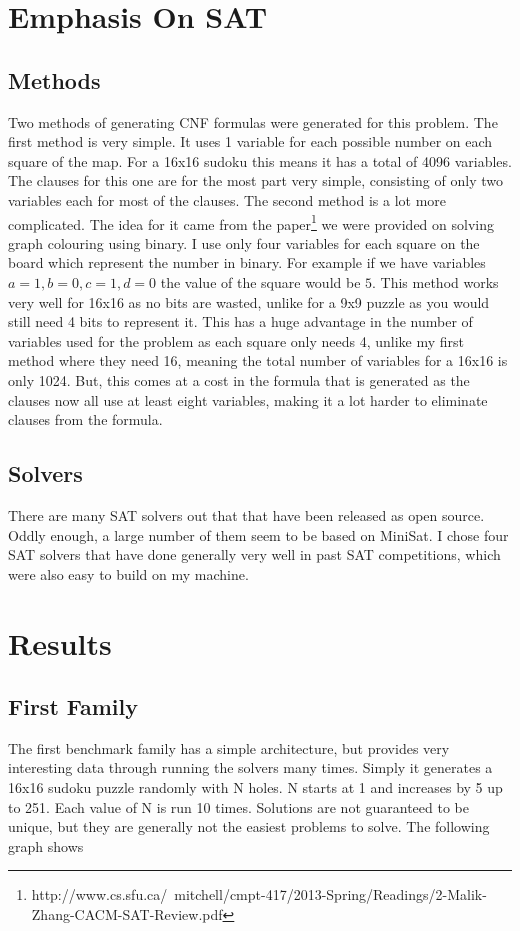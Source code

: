 \documentclass[11pt]{article} %
\begin{document}
\section{Emphasis On SAT}
\subsection{Methods}
Two methods of generating CNF formulas were generated for this problem. The first method is very simple. It uses 1 variable for each possible number on each square of the map. For a 16x16 sudoku this means it has a total of 4096 variables. The clauses for this one are for the most part very simple, consisting of only two variables each for most of the clauses. The second method is a lot more complicated. The idea for it came from the paper\footnote{http://www.cs.sfu.ca/~mitchell/cmpt-417/2013-Spring/Readings/2-Malik-Zhang-CACM-SAT-Review.pdf} we were provided on solving graph colouring using binary. I use only four variables for each square on the board which represent the number in binary. For example if we have variables $a = 1, b = 0, c = 1, d = 0$ the value of the square would be $5$. This method works very well for 16x16 as no bits are wasted, unlike for a 9x9 puzzle as you would still need 4 bits to represent it. This has a huge advantage in the number of variables used for the problem as each square only needs 4, unlike my first method where they need 16, meaning the total number of variables for a 16x16 is only 1024. But, this comes at a cost in the formula that is generated as the clauses now all use at least eight variables, making it a lot harder to eliminate clauses from the formula.
\subsection{Solvers}
There are many SAT solvers out that that have been released as open source. Oddly enough, a large number of them seem to be based on MiniSat. I chose four SAT solvers that have done generally very well in past SAT competitions, which were also easy to build on my machine.

\section{Results}
\subsection{First Family}
The first benchmark family has a simple architecture, but provides very interesting data through running the solvers many times. Simply it generates a 16x16 sudoku puzzle randomly with N holes. N starts at 1 and increases by 5 up to 251. Each value of N is run 10 times. Solutions are not guaranteed to be unique, but they are generally not the easiest problems to solve. The following graph shows
\end{document}

